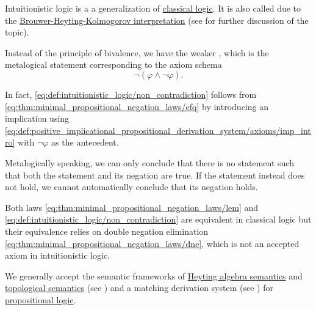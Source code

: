 \begin{definition}\label{def:intuitionistic_logic}
  Intuitionistic logic is a a generalization of \hyperref[def:classical_logic]{classical logic}. It is also called  due to the \hyperref[def:brouwer_heyting_kolmogorov_interpretation]{Brouwer-Heyting-Kolmogorov interpretation} (see  for further discussion of the topic).

  Instead of the principle of bivalence, we have the weaker , which is the metalogical statement corresponding to the axiom schema
  \begin{equation}\label{eq:def:intuitionistic_logic/non_contradiction}
    \neg (\varphi \wedge \neg \varphi). \tag{LNC}
  \end{equation}

  In fact, \eqref{eq:def:intuitionistic_logic/non_contradiction} follows from \eqref{eq:thm:minimal_propositional_negation_laws/efq} by introducing an implication using \eqref{eq:def:positive_implicational_propositional_derivation_system/axioms/imp_intro} with \( \neg \varphi \) as the antecedent.

  Metalogically speaking, we can only conclude that there is no statement such that both the statement and its negation are true. If the statement instead does not hold, we cannot automatically conclude that its negation holds.

  Both laws \eqref{eq:thm:minimal_propositional_negation_laws/lem} and \eqref{eq:def:intuitionistic_logic/non_contradiction} are equivalent in classical logic but their equivalence relies on double negation elimination \eqref{eq:thm:minimal_propositional_negation_laws/dne}, which is not an accepted axiom in intuitionistic logic.

  We generally accept the semantic frameworks of \hyperref[def:propositional_heyting_semantics]{Heyting algebra semantics} and \hyperref[def:propositional_topological_semantics]{topological semantics} (see ) and a matching derivation system (see ) for \hyperref[sec:propositional_logic]{propositional logic}.
\end{definition}

